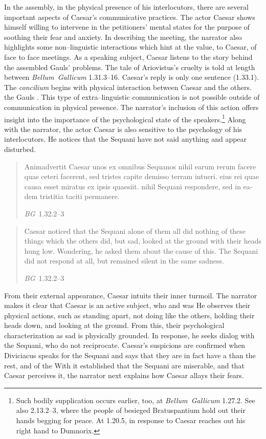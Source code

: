 \documentclass[12pt,letterpaper,oneside,final]{memoir}
\begin{document}
In the assembly, in the physical presence of his interlocutors, there are several important aspects of Caesar's communicative practices. The actor Caesar shows himself willing to intervene in the petitioners' mental states for the purpose of soothing their fear and anxiety. In describing the meeting, the narrator also highlights some non--linguistic interactions which hint at the value, to Caesar, of face to face meetings. As a speaking subject, Caesar listens to the story behind the assembled Gauls' problems. The tale of Ariovistus's cruelty is told at length between \emph{Bellum~Gallicum} 1.31.3--16. Caesar's reply is only one sentence (1.33.1). The \emph{concilium} begins with physical interaction between Caesar and the others.  the Gauls . This type of extra--linguistic communication is not possible outside of communication in physical presence. The narrator's inclusion of this action offers insight into the importance of the psychological state of the speakers.\footnote{Such bodily supplication occurs earlier, too, at \emph{Bellum~Gallicum} 1.27.2. See also 2.13.2--3, where the people of besieged Bratuspantium hold out their hands begging for peace. At 1.20.5, in response to Caesar reaches out his right hand to Dumnorix.} Along with the narrator, the actor Caesar is also sensitive to the psychology of his interlocutors. He notices that the Sequani have not said anything and appear disturbed. \blockquote[\emph{BG}~1.32.2--3]{\textlatin{Animadvertit Caesar unos ex omnibus Sequanos nihil earum rerum facere quas ceteri facerent, sed tristes capite demisso terram intueri. eius rei quae causa esset miratus ex ipsis quaesiit. nihil Sequani respondere, sed in eadem tristitia taciti permanere.}} \blockquote[\emph{BG}~1.32.2--3]{\textlatin{Caesar noticed that the Sequani alone of them all did nothing of these things which the others did, but sad, looked at the ground with their heads hung low. Wondering, he asked them about the cause of this. The Sequani did not respond at all, but remained silent in the same sadness.}} From their external appearance, Caesar intuits their inner turmoil. The narrator makes it clear that Caesar is an active subject, who  and was  He observes their physical actions, such as standing apart, not doing like the others, holding their heads down, and looking at the ground. From this, their psychological characterization as sad is physically grounded. In response, he seeks dialog with the Sequani, who do not reciprocate. Caesar's suspicions are confirmed when Diviciacus speaks for the Sequani and says that they are in fact have a  than the rest, and  of the  With it established that the Sequani are miserable, and that Caesar perceives it, the narrator next explains how Caesar allays their fears.
\end{document}
